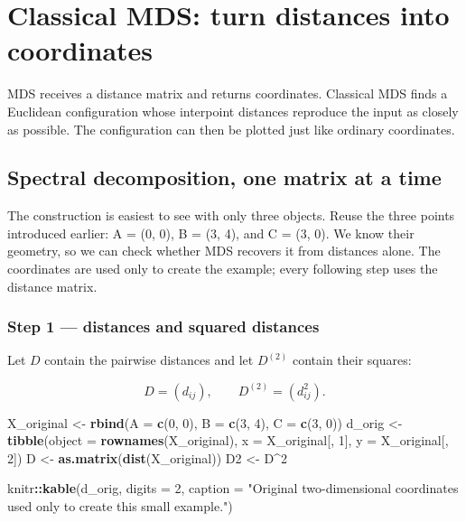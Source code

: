 \documentclass[
  english,
]{article}
\newenvironment{Shaded}{\begin{snugshade}}{\end{snugshade}}
\newcommand{\AttributeTok}[1]{\textcolor[rgb]{0.13,0.29,0.53}{#1}}
\newcommand{\DecValTok}[1]{\textcolor[rgb]{0.00,0.00,0.81}{#1}}
\newcommand{\FunctionTok}[1]{\textcolor[rgb]{0.13,0.29,0.53}{\textbf{#1}}}
\newcommand{\NormalTok}[1]{#1}
\newcommand{\OtherTok}[1]{\textcolor[rgb]{0.56,0.35,0.01}{#1}}
\newcommand{\SpecialCharTok}[1]{\textcolor[rgb]{0.81,0.36,0.00}{\textbf{#1}}}
\newcommand{\StringTok}[1]{\textcolor[rgb]{0.31,0.60,0.02}{#1}}
\begin{document}
\section{Classical MDS: turn distances into
coordinates}\label{classical-mds-turn-distances-into-coordinates}

MDS receives a distance matrix and returns coordinates. Classical MDS
finds a Euclidean configuration whose interpoint distances reproduce the
input as closely as possible. The configuration can then be plotted just
like ordinary coordinates.

\subsection{Spectral decomposition, one matrix at a
time}\label{spectral-decomposition-one-matrix-at-a-time}

The construction is easiest to see with only three objects. Reuse the
three points introduced earlier: A = (0, 0), B = (3, 4), and C = (3, 0).
We know their geometry, so we can check whether MDS recovers it from
distances alone. The coordinates are used only to create the example;
every following step uses the distance matrix.

\subsubsection{Step 1 --- distances and squared
distances}\label{step-1-distances-and-squared-distances}

Let \(D\) contain the pairwise distances and let \(D^{(2)}\) contain
their squares:

\[D=(d_{ij}), \qquad D^{(2)}=(d_{ij}^2).\]

\begin{Shaded}
\begin{Highlighting}[]
\NormalTok{X\_original }\OtherTok{\textless{}{-}} \FunctionTok{rbind}\NormalTok{(}\AttributeTok{A =} \FunctionTok{c}\NormalTok{(}\DecValTok{0}\NormalTok{, }\DecValTok{0}\NormalTok{), }\AttributeTok{B =} \FunctionTok{c}\NormalTok{(}\DecValTok{3}\NormalTok{, }\DecValTok{4}\NormalTok{), }\AttributeTok{C =} \FunctionTok{c}\NormalTok{(}\DecValTok{3}\NormalTok{, }\DecValTok{0}\NormalTok{))}
\NormalTok{d\_orig }\OtherTok{\textless{}{-}} \FunctionTok{tibble}\NormalTok{(}\AttributeTok{object =} \FunctionTok{rownames}\NormalTok{(X\_original), }\AttributeTok{x =}\NormalTok{ X\_original[, }\DecValTok{1}\NormalTok{], }\AttributeTok{y =}\NormalTok{ X\_original[, }\DecValTok{2}\NormalTok{])}
\NormalTok{D }\OtherTok{\textless{}{-}} \FunctionTok{as.matrix}\NormalTok{(}\FunctionTok{dist}\NormalTok{(X\_original))}
\NormalTok{D2 }\OtherTok{\textless{}{-}}\NormalTok{ D}\SpecialCharTok{\^{}}\DecValTok{2}

\NormalTok{knitr}\SpecialCharTok{::}\FunctionTok{kable}\NormalTok{(d\_orig, }\AttributeTok{digits =} \DecValTok{2}\NormalTok{, }\AttributeTok{caption =} \StringTok{"Original two{-}dimensional coordinates used only to create this small example."}\NormalTok{)}
\end{Highlighting}
\end{Shaded}
\end{document}
